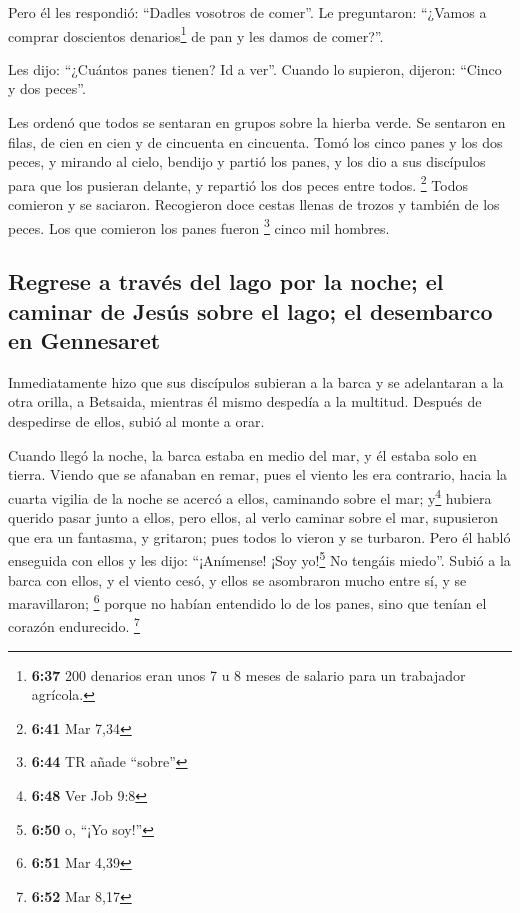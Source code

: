  Pero él les respondió: ``Dadles vosotros de comer''. Le
preguntaron: ``¿Vamos a comprar doscientos denarios\footnote{\textbf{6:37}
  200 denarios eran unos 7 u 8 meses de salario para un trabajador
  agrícola.} de pan y les damos de comer?''.

 Les dijo: ``¿Cuántos panes tienen? Id a ver''. Cuando lo
supieron, dijeron: ``Cinco y dos peces''.

 Les ordenó que todos se sentaran en grupos sobre la
hierba verde.  Se sentaron en filas, de cien en cien y de
cincuenta en cincuenta.  Tomó los cinco panes y los dos
peces, y mirando al cielo, bendijo y partió los panes, y los dio a sus
discípulos para que los pusieran delante, y repartió los dos peces entre
todos. \footnote{\textbf{6:41} Mar 7,34}  Todos comieron
y se saciaron.  Recogieron doce cestas llenas de trozos y
también de los peces.  Los que comieron los panes fueron
\footnote{\textbf{6:44} TR añade ``sobre''} cinco mil hombres.

\hypertarget{regrese-a-travuxe9s-del-lago-por-la-noche-el-caminar-de-jesuxfas-sobre-el-lago-el-desembarco-en-gennesaret}{%
\subsection{Regrese a través del lago por la noche; el caminar de Jesús
sobre el lago; el desembarco en
Gennesaret}\label{regrese-a-travuxe9s-del-lago-por-la-noche-el-caminar-de-jesuxfas-sobre-el-lago-el-desembarco-en-gennesaret}}

 Inmediatamente hizo que sus discípulos subieran a la
barca y se adelantaran a la otra orilla, a Betsaida, mientras él mismo
despedía a la multitud.  Después de despedirse de ellos,
subió al monte a orar.

 Cuando llegó la noche, la barca estaba en medio del mar,
y él estaba solo en tierra.  Viendo que se afanaban en
remar, pues el viento les era contrario, hacia la cuarta vigilia de la
noche se acercó a ellos, caminando sobre el mar; y\footnote{\textbf{6:48}
  Ver Job 9:8} hubiera querido pasar junto a ellos,  pero
ellos, al verlo caminar sobre el mar, supusieron que era un fantasma, y
gritaron;  pues todos lo vieron y se turbaron. Pero él
habló enseguida con ellos y les dijo: ``¡Anímense! ¡Soy yo!\footnote{\textbf{6:50}
  o, ``¡Yo soy!''} No tengáis miedo''.  Subió a la barca
con ellos, y el viento cesó, y ellos se asombraron mucho entre sí, y se
maravillaron; \footnote{\textbf{6:51} Mar 4,39}  porque
no habían entendido lo de los panes, sino que tenían el corazón
endurecido. \footnote{\textbf{6:52} Mar 8,17}

